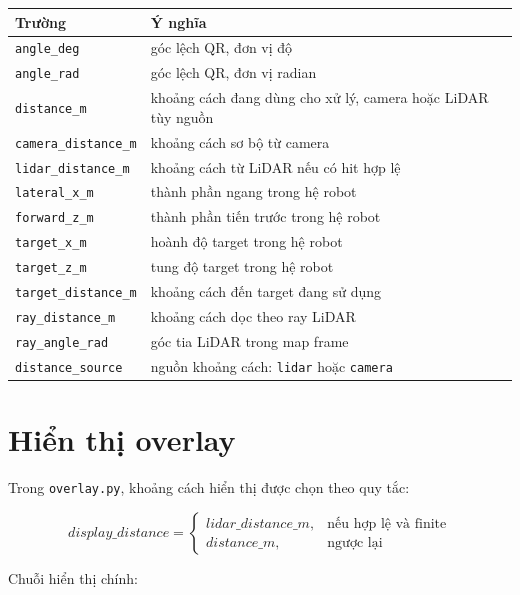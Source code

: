 \documentclass[12pt,a4paper]{article}
\begin{document}
\begin{longtable}{|>{\raggedright\arraybackslash}p{4cm}|>{\raggedright\arraybackslash}p{9cm}|}
\hline
Trường & Ý nghĩa \\ \hline
\texttt{angle\_deg} & góc lệch QR, đơn vị độ \\ \hline
\texttt{angle\_rad} & góc lệch QR, đơn vị radian \\ \hline
\texttt{distance\_m} & khoảng cách đang dùng cho xử lý, camera hoặc LiDAR tùy nguồn \\ \hline
\texttt{camera\_distance\_m} & khoảng cách sơ bộ từ camera \\ \hline
\texttt{lidar\_distance\_m} & khoảng cách từ LiDAR nếu có hit hợp lệ \\ \hline
\texttt{lateral\_x\_m} & thành phần ngang trong hệ robot \\ \hline
\texttt{forward\_z\_m} & thành phần tiến trước trong hệ robot \\ \hline
\texttt{target\_x\_m} & hoành độ target trong hệ robot \\ \hline
\texttt{target\_z\_m} & tung độ target trong hệ robot \\ \hline
\texttt{target\_distance\_m} & khoảng cách đến target đang sử dụng \\ \hline
\texttt{ray\_distance\_m} & khoảng cách dọc theo ray LiDAR \\ \hline
\texttt{ray\_angle\_rad} & góc tia LiDAR trong map frame \\ \hline
\texttt{distance\_source} & nguồn khoảng cách: \texttt{lidar} hoặc \texttt{camera} \\ \hline
\end{longtable}

\section{Hiển thị overlay}

Trong \texttt{overlay.py}, khoảng cách hiển thị được chọn theo quy tắc:

\begin{equation}
display\_distance =
\begin{cases}
lidar\_distance\_m, & \text{nếu hợp lệ và finite} \\
distance\_m, & \text{ngược lại}
\end{cases}
\end{equation}

Chuỗi hiển thị chính:
\end{document}
